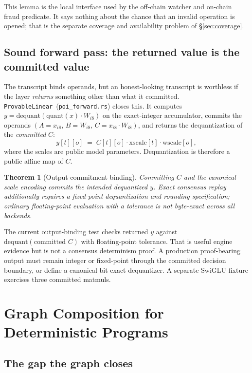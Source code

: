 \documentclass[11pt,a4paper]{article}
\newtheorem{theorem}{Theorem}
\begin{document}
This lemma is the local interface used by the off-chain watcher and on-chain fraud predicate. It says nothing about the chance that an invalid operation is opened; that is the separate coverage and availability problem of \S\ref{sec:coverage}.

\subsection{Sound forward pass: the returned value is the committed value}\label{sec:forward}

The transcript binds operands, but an honest-looking transcript is worthless if the layer \emph{returns} something other than what it committed. \texttt{ProvableLinear}~(\texttt{poi\_forward.rs}) closes this. It computes $y = \mathrm{dequant}(\mathrm{quant}(x) \cdot W_{i8})$ on the exact-integer accumulator, commits the operands $(A = x_{i8},\, B = W_{i8},\, C = x_{i8}\!\cdot\!W_{i8})$, and returns the dequantization of the \emph{committed} $C$:
\[
  y[t][o] \;=\; C[t][o] \cdot \text{xscale}[t] \cdot \text{wscale}[o],
\]
where the scales are public model parameters. Dequantization is therefore a public affine map of $C$.

\begin{theorem}[Output-commitment binding]\label{thm:output}
Committing $C$ and the canonical scale encoding commits the intended dequantized $y$. Exact consensus replay additionally requires a fixed-point dequantization and rounding specification; ordinary floating-point evaluation with a tolerance is not byte-exact across all backends.
\end{theorem}

The current output-binding test checks returned $y$ against $\mathrm{dequant}(\text{committed } C)$ with floating-point tolerance. That is useful engine evidence but is not a consensus determinism proof. A production proof-bearing output must remain integer or fixed-point through the committed decision boundary, or define a canonical bit-exact dequantizer. A separate SwiGLU fixture exercises three committed matmuls.

\section{Graph Composition for Deterministic Programs}\label{sec:graph}

\subsection{The gap the graph closes}
\end{document}
